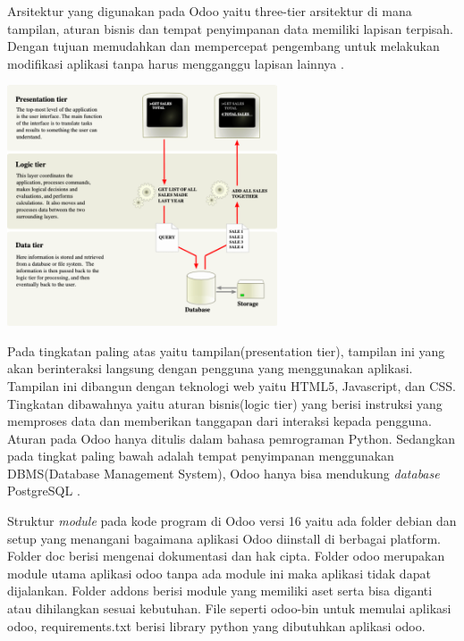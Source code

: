 Arsitektur yang digunakan pada Odoo yaitu three-tier arsitektur di mana tampilan, aturan bisnis dan tempat penyimpanan data memiliki lapisan terpisah. Dengan tujuan memudahkan dan mempercepat pengembang untuk melakukan modifikasi aplikasi tanpa harus mengganggu lapisan lainnya \cite{odoo}.

\begin{center}
	\includegraphics[width=8cm]{img/arsitekturOdoo.PNG}
	\label{fig:asd}
\end{center}

Pada tingkatan paling atas yaitu tampilan(presentation tier), tampilan ini yang akan berinteraksi langsung dengan pengguna yang menggunakan aplikasi. Tampilan ini dibangun dengan teknologi web yaitu HTML5, Javascript, dan CSS. Tingkatan dibawahnya yaitu aturan bisnis(logic tier) yang berisi instruksi yang memproses data dan memberikan tanggapan dari interaksi kepada pengguna. Aturan pada Odoo hanya ditulis dalam bahasa pemrograman Python. Sedangkan pada tingkat paling bawah adalah tempat penyimpanan menggunakan DBMS(Database Management System), Odoo hanya bisa mendukung \textit{database} PostgreSQL \cite{odoo}.

Struktur \textit{module} pada kode program di Odoo versi 16 yaitu ada folder debian dan setup yang menangani bagaimana aplikasi Odoo diinstall di berbagai platform. Folder doc berisi mengenai dokumentasi dan hak cipta. Folder odoo merupakan module utama aplikasi odoo tanpa ada module ini maka aplikasi tidak dapat dijalankan. Folder addons berisi module yang memiliki aset serta bisa diganti atau dihilangkan sesuai kebutuhan. File seperti odoo-bin untuk memulai aplikasi odoo, requirements.txt berisi library python yang dibutuhkan aplikasi odoo.

